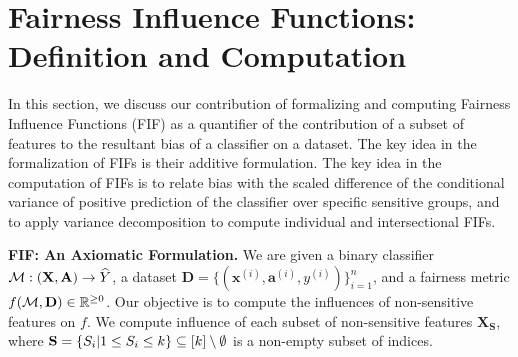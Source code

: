 \section{Fairness Influence Functions: Definition and Computation}\label{sec:fifs}
In this section, we discuss our contribution of formalizing and computing Fairness Influence Functions (FIF) as a quantifier of the contribution of a subset of features to the resultant bias of a classifier on a dataset. The key idea in the formalization of FIFs is their additive formulation. The key idea in the computation of FIFs is to relate bias with the scaled difference of the conditional variance of positive prediction of the classifier over specific sensitive groups, and to apply variance decomposition to compute individual and intersectional FIFs. %

\noindent\textbf{FIF: An Axiomatic Formulation.} We are given a binary classifier  $\mathcal{M}: (\mathbf{X}, \mathbf{A}) \rightarrow \widehat{Y} $, a dataset $ \mathbf{D} = \{(\mathbf{x}^{(i)}, \mathbf{a}^{(i)}, y^{(i)})\}_{i=1}^n $, and a  fairness metric $ f(\mathcal{M}, \mathbf{D}) \in \mathbb{R}^{\geq 0} $. Our objective is to compute the influences of non-sensitive features on $ f $. We compute influence of each subset of non-sensitive features $ \mathbf{X}_{\mathbf{S}} $, where $ \mathbf{S} = \{S_i | 1 \le S_i \le k\} \subseteq [k] \setminus \emptyset $ is a non-empty subset of indices. 

